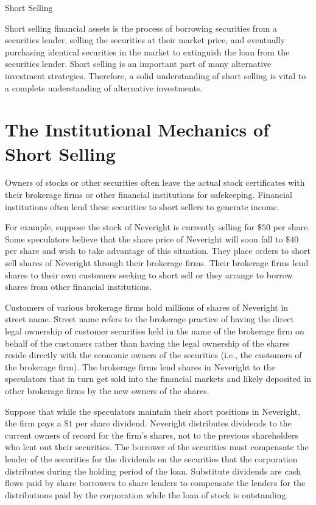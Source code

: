 \documentclass[11pt]{article}
\begin{document}
Short Selling

Short selling financial assets is the process of borrowing securities from a securities lender, selling the securities at their market price, and eventually purchasing identical securities in the market to extinguish the loan from the securities lender. Short selling is an important part of many alternative investment strategies. Therefore, a solid understanding of short selling is vital to a complete understanding of alternative investments.

\section*{The Institutional Mechanics of Short Selling}
Owners of stocks or other securities often leave the actual stock certificates with their brokerage firms or other financial institutions for safekeeping. Financial institutions often lend these securities to short sellers to generate income.

For example, suppose the stock of Neveright is currently selling for $\$ 50$ per share. Some speculators believe that the share price of Neveright will soon fall to $\$ 40$ per share and wish to take advantage of this situation. They place orders to short sell shares of Neveright through their brokerage firms. Their brokerage firms lend shares to their own customers seeking to short sell or they arrange to borrow shares from other financial institutions.

Customers of various brokerage firms hold millions of shares of Neveright in street name. Street name refers to the brokerage practice of having the direct legal ownership of customer securities held in the name of the brokerage firm on behalf of the customers rather than having the legal ownership of the shares reside directly with the economic owners of the securities (i.e., the customers of the brokerage firm). The brokerage firms lend shares in Neveright to the speculators that in turn get sold into the financial markets and likely deposited in other brokerage firms by the new owners of the shares.

Suppose that while the speculators maintain their short positions in Neveright, the firm pays a $\$ 1$ per share dividend. Neveright distributes dividends to the current owners of record for the firm's shares, not to the previous shareholders who lent out their securities. The borrower of the securities must compensate the lender of the securities for the dividends on the securities that the corporation distributes during the holding period of the loan. Substitute dividends are cash flows paid by share borrowers to share lenders to compensate the lenders for the distributions paid by the corporation while the loan of stock is outstanding.
\end{document}
